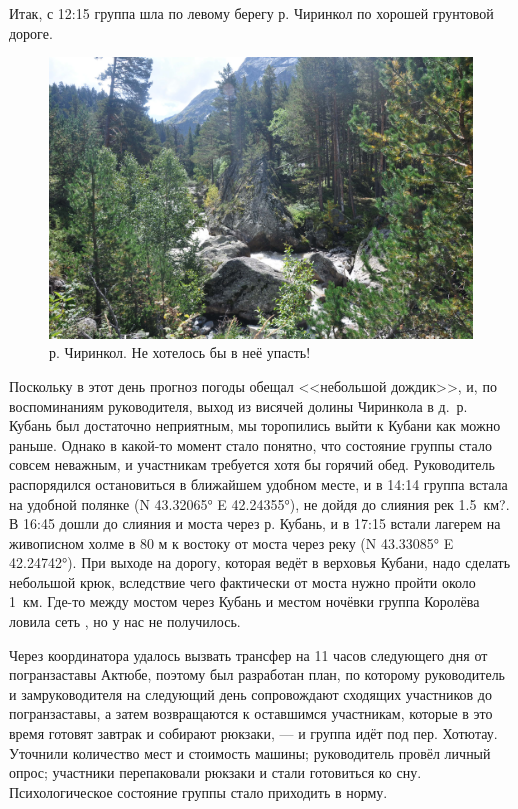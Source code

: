 Итак, с 12:15 группа шла по левому берегу р. Чиринкол по хорошей грунтовой дороге.
 
\begin{figure}[h!]
	\centering
	\includegraphics[width=0.7\linewidth]{../pics/DSC_0461 2}
	\caption{р. Чиринкол. Не хотелось бы в неё упасть!}
	\label{fig:DSC_0461}
\end{figure}

Поскольку в этот день прогноз погоды обещал <<небольшой дождик>>\texttrademark, и, по воспоминаниям руководителя, выход из висячей долины Чиринкола в д.~р. Кубань был достаточно неприятным, мы торопились выйти к Кубани как можно раньше. Однако в какой-то момент стало понятно, что состояние группы стало совсем неважным, и участникам требуется хотя бы горячий обед. Руководитель распорядился остановиться в ближайшем удобном месте, и в 14:14 группа встала на удобной полянке (N 43.32065° E 42.24355°), не дойдя до слияния рек 1.5~км?. В 16:45 дошли до слияния и моста через р. Кубань, и в 17:15 встали лагерем на живописном холме в 80 м к востоку от моста через реку (N 43.33085° E 42.24742°). При выходе на дорогу, которая ведёт в верховья Кубани, надо сделать небольшой крюк, вследствие чего фактически от моста нужно пройти около 1~км.  Где-то между мостом через Кубань и местом ночёвки группа Королёва ловила сеть \cite{Korolyov2018}, но у нас не получилось. 

Через координатора удалось вызвать трансфер на 11 часов следующего дня от погранзаставы Актюбе, поэтому был разработан план, по которому руководитель и замруководителя на следующий день сопровождают сходящих участников до погранзаставы, а затем возвращаются к оставшимся участникам, которые в это время готовят завтрак и собирают рюкзаки, --- и группа идёт под пер. Хотютау. Уточнили количество мест и стоимость машины; руководитель провёл личный опрос; участники перепаковали рюкзаки и стали готовиться ко сну. Психологическое состояние группы стало приходить в норму.

\clearpage
